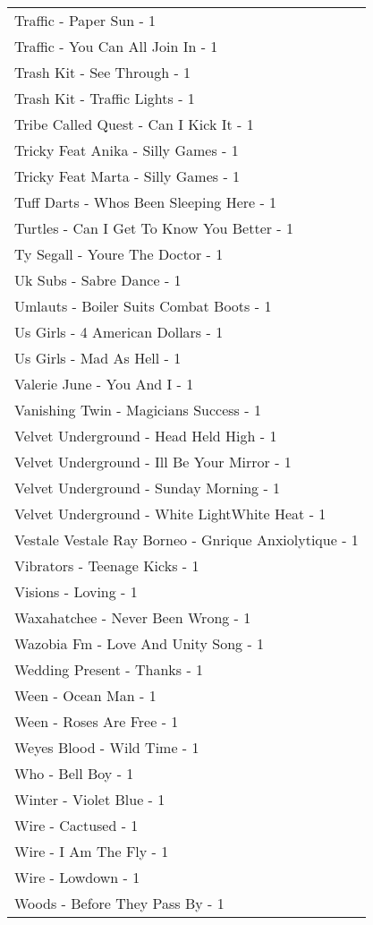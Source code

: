 \documentclass[
]{article}
\begin{document}
\begin{longtable}{l}
Traffic - Paper Sun - 1 \\ 
Traffic - You Can All Join In - 1 \\ 
Trash Kit - See Through - 1 \\ 
Trash Kit - Traffic Lights - 1 \\ 
Tribe Called Quest - Can I Kick It - 1 \\ 
Tricky Feat Anika - Silly Games - 1 \\ 
Tricky Feat Marta - Silly Games - 1 \\ 
Tuff Darts - Whos Been Sleeping Here - 1 \\ 
Turtles - Can I Get To Know You Better - 1 \\ 
Ty Segall - Youre The Doctor - 1 \\ 
Uk Subs - Sabre Dance - 1 \\ 
Umlauts - Boiler Suits Combat Boots - 1 \\ 
Us Girls - 4 American Dollars - 1 \\ 
Us Girls - Mad As Hell - 1 \\ 
Valerie June - You And I - 1 \\ 
Vanishing Twin - Magicians Success - 1 \\ 
Velvet Underground - Head Held High - 1 \\ 
Velvet Underground - Ill Be Your Mirror - 1 \\ 
Velvet Underground - Sunday Morning - 1 \\ 
Velvet Underground - White LightWhite Heat - 1 \\ 
Vestale Vestale Ray Borneo - Gnrique Anxiolytique - 1 \\ 
Vibrators - Teenage Kicks - 1 \\ 
Visions - Loving - 1 \\ 
Waxahatchee - Never Been Wrong - 1 \\ 
Wazobia Fm - Love And Unity Song - 1 \\ 
Wedding Present - Thanks - 1 \\ 
Ween - Ocean Man - 1 \\ 
Ween - Roses Are Free - 1 \\ 
Weyes Blood - Wild Time - 1 \\ 
Who - Bell Boy - 1 \\ 
Winter - Violet Blue - 1 \\ 
Wire - Cactused - 1 \\ 
Wire - I Am The Fly - 1 \\ 
Wire - Lowdown - 1 \\ 
Woods - Before They Pass By - 1 \\ 

\end{longtable}
\end{document}
